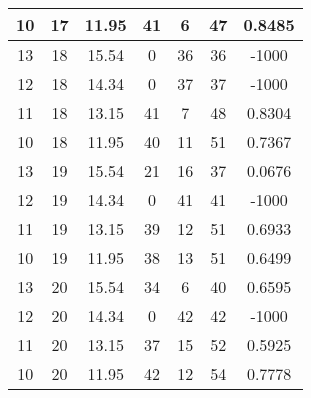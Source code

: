 \documentclass[letterpaper, 12pt]{article}
\begin{document}
\begin{longtable}{|c|c|c|c|c|c|c|}
10 & 17 & 11.95 & 41 & 6 & 47 & 0.8485 \\
\hline
13 & 18 & 15.54 & 0 & 36 & 36 & -1000 \\
\hline
12 & 18 & 14.34 & 0 & 37 & 37 & -1000 \\
\hline
11 & 18 & 13.15 & 41 & 7 & 48 & 0.8304 \\
\hline
10 & 18 & 11.95 & 40 & 11 & 51 & 0.7367 \\
\hline
13 & 19 & 15.54 & 21 & 16 & 37 & 0.0676 \\
\hline
12 & 19 & 14.34 & 0 & 41 & 41 & -1000 \\
\hline
11 & 19 & 13.15 & 39 & 12 & 51 & 0.6933 \\
\hline
10 & 19 & 11.95 & 38 & 13 & 51 & 0.6499 \\
\hline
13 & 20 & 15.54 & 34 & 6 & 40 & 0.6595 \\
\hline
12 & 20 & 14.34 & 0 & 42 & 42 & -1000 \\
\hline
11 & 20 & 13.15 & 37 & 15 & 52 & 0.5925 \\
\hline
10 & 20 & 11.95 & 42 & 12 & 54 & 0.7778 \\
\hline
\end{longtable}
\end{document}
